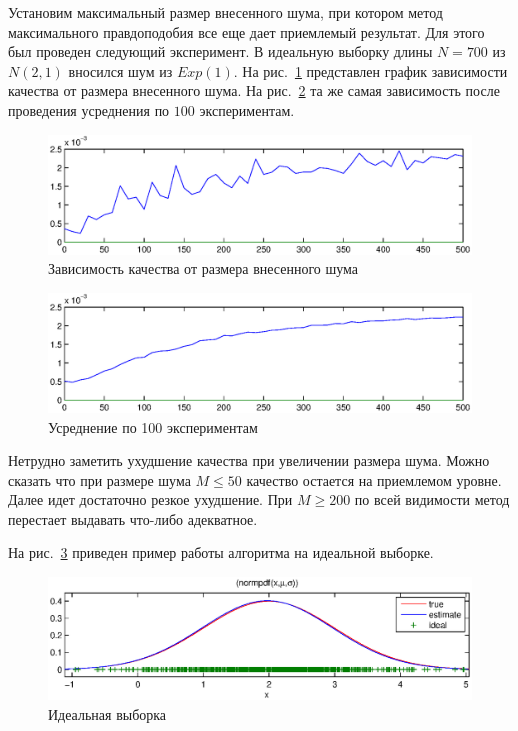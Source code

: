\documentclass[10pt, a4paper]{article}
\begin{document}
Установим максимальный размер внесенного шума, при котором метод максимального правдоподобия все еще дает
приемлемый результат. Для этого был проведен следующий эксперимент. В идеальную выборку длины $N=700$ из 
$N(2,1)$ вносился шум из $Exp(1)$. На рис.~\ref{noise_length} представлен график зависимости качества от 
размера внесенного шума. На рис.~\ref{noise_length_avg} та же самая зависимость после проведения усреднения 
по $100$ экспериментам.
\begin{figure}[h]
    \includegraphics[width=\textwidth]{noise_length.eps}
    \caption{Зависимость качества от размера внесенного шума}
    \label{noise_length}
\end{figure}
\begin{figure}[h]
    \includegraphics[width=\textwidth]{noise_length_avg.eps}
    \caption{Усреднение по 100 экспериментам}
    \label{noise_length_avg}
\end{figure}
Нетрудно заметить ухудшение качества при увеличении размера шума. Можно сказать что при размере шума
$M\le50$ качество остается на приемлемом уровне. Далее идет достаточно резкое ухудшение.
При $M\ge200$ по всей видимости метод перестает выдавать что-либо адекватное.

На рис.~\ref{ideal_nle} приведен пример работы алгоритма на идеальной выборке.
\begin{figure}[h]
    \includegraphics[width=\textwidth]{ideal_nle.eps}
    \caption{Идеальная выборка}
    \label{ideal_nle}
\end{figure}
\end{document}
